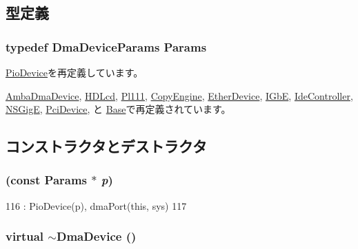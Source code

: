 \subsection{型定義}
\hypertarget{classDmaDevice_aea7daf6105ab956443385f5f5a9b88c5}{
\subsubsection[{Params}]{\setlength{\rightskip}{0pt plus 5cm}typedef DmaDeviceParams {\bf Params}}}
\label{classDmaDevice_aea7daf6105ab956443385f5f5a9b88c5}


\hyperlink{classPioDevice_a9cdbda5b5cc24147ce82b7d07bf03cd1}{PioDevice}を再定義しています。

\hyperlink{classAmbaDmaDevice_ab612ceb7381438552927b7ed0aed5099}{AmbaDmaDevice}, \hyperlink{classHDLcd_a31ccb03af3b5962a67bed42eca6ce2f0}{HDLcd}, \hyperlink{classPl111_a98df8e62be26dfc2009a7e53d5d0841d}{Pl111}, \hyperlink{classCopyEngine_a0b0580d58d6a0384646682653aefb97a}{CopyEngine}, \hyperlink{classEtherDevice_afcf43c7944288000e850f783bdd66b9d}{EtherDevice}, \hyperlink{classIGbE_ad27b5cfed87f35a483863a73336d8258}{IGbE}, \hyperlink{classIdeController_ac3896424d9bf2d8a838f1e2c38870d02}{IdeController}, \hyperlink{classNSGigE_a3d96e676dc626c146631b6fa53a9d823}{NSGigE}, \hyperlink{classPciDevice_aefbfd3f2d9daf3173b779eeff32e8112}{PciDevice}, と \hyperlink{classSinic_1_1Base_ae32fbee6dea75ffbb01b7d869c7bedad}{Base}で再定義されています。

\subsection{コンストラクタとデストラクタ}
\hypertarget{classDmaDevice_af4b097d003744f742495ee91bee709da}{
\subsubsection[{DmaDevice}]{ (const {\bf Params} $\ast$ {\em p})}}
\label{classDmaDevice_af4b097d003744f742495ee91bee709da}



\begin{DoxyCode}
116     : PioDevice(p), dmaPort(this, sys)
117 { }
\end{DoxyCode}
\hypertarget{classDmaDevice_a28cd9afaa9eacf209f0380ffcce5ec72}{
\subsubsection[{$\sim$DmaDevice}]{\setlength{\rightskip}{0pt plus 5cm}virtual $\sim${\bf DmaDevice} ()}}
\label{classDmaDevice_a28cd9afaa9eacf209f0380ffcce5ec72}



